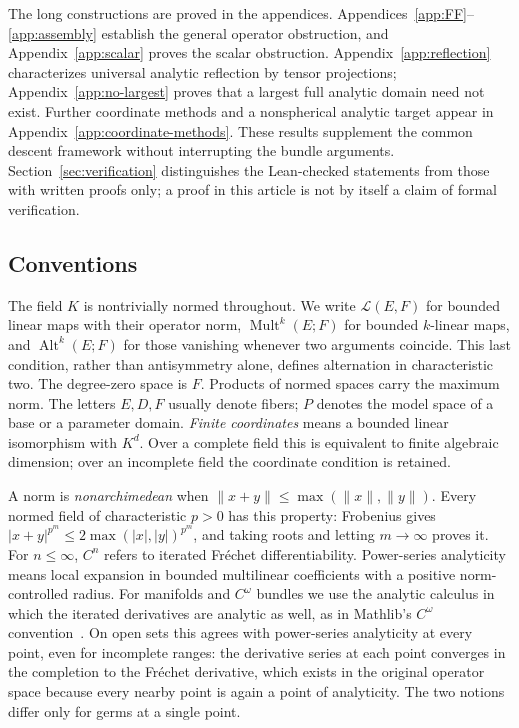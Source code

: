 \documentclass[11pt]{amsart}
\theoremstyle{definition}
\theoremstyle{remark}
\numberwithin{equation}{section}
\newcommand{\cL}{\mathcal L}
\newcommand{\Alt}{\operatorname{Alt}}
\newcommand{\Mult}{\operatorname{Mult}}
\newcommand{\abs}[1]{\lvert #1\rvert}
\newcommand{\norm}[1]{\lVert #1\rVert}
\begin{document}
The long constructions are proved in the appendices. Appendices~\ref{app:FF}--\ref{app:assembly}
establish the general operator obstruction, and Appendix~\ref{app:scalar} proves the scalar obstruction.
Appendix~\ref{app:reflection} characterizes universal analytic reflection by tensor projections;
Appendix~\ref{app:no-largest} proves that a largest full analytic domain need not exist.
Further coordinate methods and a nonspherical analytic target appear in
Appendix~\ref{app:coordinate-methods}. These results supplement the common descent framework without
interrupting the bundle arguments. Section~\ref{sec:verification} distinguishes the Lean-checked
statements from those with written proofs only; a proof in this article is not by itself a claim
of formal verification.

\subsection*{Conventions}
The field $K$ is nontrivially normed throughout. We write $\cL(E,F)$ for bounded linear maps with their
operator norm, $\Mult^k(E;F)$ for bounded $k$-linear maps, and $\Alt^k(E;F)$ for those vanishing whenever
two arguments coincide. This last condition, rather than antisymmetry alone, defines alternation in
characteristic two. The degree-zero space is $F$. Products of normed spaces carry the maximum norm.
The letters $E,D,F$ usually denote fibers; $P$ denotes the model space of a base or a parameter domain.
\emph{Finite coordinates} means a bounded linear isomorphism with $K^d$. Over a complete field this is
equivalent to finite algebraic dimension; over an incomplete field the coordinate condition is retained.

A norm is \emph{nonarchimedean} when $\norm{x+y}\le\max(\norm x,\norm y)$.
Every normed field of characteristic $p>0$ has this property: Frobenius gives
$\abs{x+y}^{p^m}\le2\max(\abs x,\abs y)^{p^m}$, and taking roots and letting $m\to\infty$ proves it.
For $n\le\infty$, $C^n$ refers to iterated Fr\'echet differentiability. Power-series analyticity means
local expansion in bounded multilinear coefficients with a positive norm-controlled radius.
For manifolds and $C^\omega$ bundles we use the analytic calculus in which the iterated derivatives are
analytic as well, as in Mathlib's $C^\omega$ convention~\cite{docs}. On open sets this agrees with
power-series analyticity at every point, even for incomplete ranges: the derivative series at each point
converges in the completion to the Fr\'echet derivative, which exists in the original operator space because every nearby point is again a point of analyticity. The two notions
differ only for germs at a single point.
\end{document}
